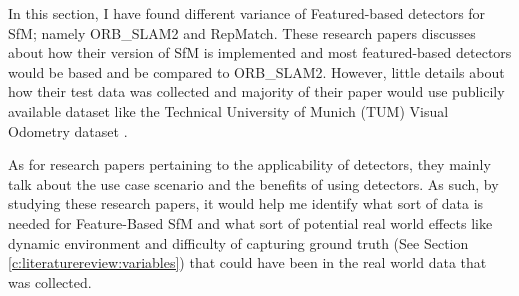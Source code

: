 In this section, I have found different variance of Featured-based detectors for SfM; namely ORB\_SLAM2 and RepMatch. These research papers discusses about how their version of SfM is implemented and most featured-based detectors would be based and be compared to ORB\_SLAM2. However, little details about how their test data was collected and majority of their paper would use publicily available dataset like the Technical University of Munich (TUM) Visual Odometry dataset \cite{sturm12iros}. 

As for research papers pertaining to the applicability of detectors, they mainly talk about the use case scenario and the benefits of using detectors. As such, by studying these research papers, it would help me identify what sort of data is needed for Feature-Based SfM and what sort of potential real world effects like dynamic environment and difficulty of capturing ground truth (See Section \ref{c:literaturereview:variables}) that could have been in the real world data that was collected.